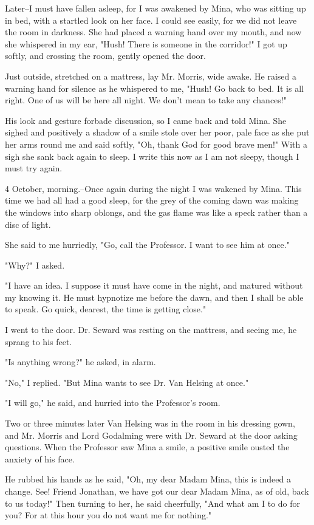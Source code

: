 Later--I must have fallen asleep, for I was awakened by Mina, who was sitting up in bed, with a startled look on her face. I could see easily, for we did not leave the room in darkness. She had placed a warning hand over my mouth, and now she whispered in my ear, "Hush! There is someone in the corridor!" I got up softly, and crossing the room, gently opened the door. 

Just outside, stretched on a mattress, lay Mr. Morris, wide awake. He raised a warning hand for silence as he whispered to me, "Hush! Go back to bed. It is all right. One of us will be here all night. We don't mean to take any chances!" 

His look and gesture forbade discussion, so I came back and told Mina. She sighed and positively a shadow of a smile stole over her poor, pale face as she put her arms round me and said softly, "Oh, thank God for good brave men!" With a sigh she sank back again to sleep. I write this now as I am not sleepy, though I must try again. 

4 October, morning.--Once again during the night I was wakened by Mina. This time we had all had a good sleep, for the grey of the coming dawn was making the windows into sharp oblongs, and the gas flame was like a speck rather than a disc of light. 

She said to me hurriedly, "Go, call the Professor. I want to see him at once." 

"Why?" I asked. 

"I have an idea. I suppose it must have come in the night, and matured without my knowing it. He must hypnotize me before the dawn, and then I shall be able to speak. Go quick, dearest, the time is getting close." 

I went to the door. Dr. Seward was resting on the mattress, and seeing me, he sprang to his feet. 

"Is anything wrong?" he asked, in alarm. 

"No," I replied. "But Mina wants to see Dr. Van Helsing at once." 

"I will go," he said, and hurried into the Professor's room. 

Two or three minutes later Van Helsing was in the room in his dressing gown, and Mr. Morris and Lord Godalming were with Dr. Seward at the door asking questions. When the Professor saw Mina a smile, a positive smile ousted the anxiety of his face. 

He rubbed his hands as he said, "Oh, my dear Madam Mina, this is indeed a change. See! Friend Jonathan, we have got our dear Madam Mina, as of old, back to us today!" Then turning to her, he said cheerfully, "And what am I to do for you? For at this hour you do not want me for nothing." 

